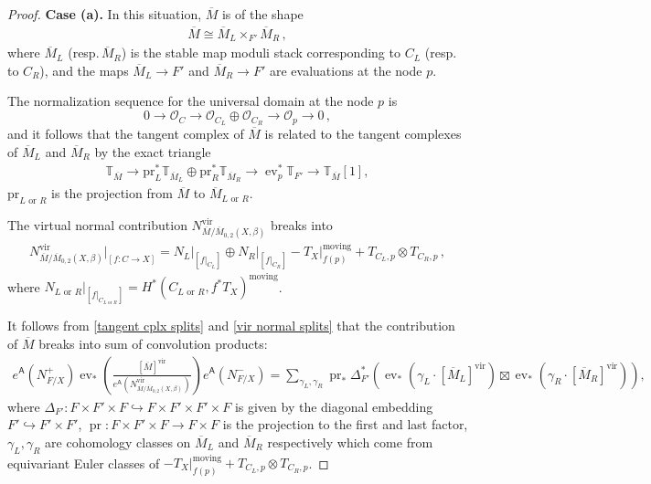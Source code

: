 \documentclass[10pt]{amsart}
\theoremstyle{definition}
\numberwithin{equation}{section}
\newcommand{\oO}{\mathcal{O}}
\newcommand{\vir}{\mathrm{vir}}
\newcommand{\sA}{\mathsf{A}}
\newcommand{\ev}{\operatorname{ev}}
\newcommand{\pr}{\operatorname{pr}}
\begin{document}
\begin{proof}
\textbf{Case (a).} In this situation, $\overline{M}$ is of the shape
\begin{align*}
    \overline{M}\cong \overline{M}_L\times_{F'} \overline{M}_R\,,
\end{align*}
where $\overline{M}_L$ (resp.\,$\overline{M}_R$) is the stable map moduli stack corresponding to $C_L$ (resp.\,to $C_R$), and the maps $\overline{M}_L\to F'$ and $\overline{M}_R\to F'$ are evaluations at the node $p$. 

The normalization sequence for the universal domain at the node $p$ is 
$$0\to \oO_{C} \to  \oO_{C_L}\oplus \oO_{C_R}\to \oO_{p} \to 0\,, $$
and it follows that the tangent complex of $\overline{M}$ is related to the tangent complexes of $\overline{M}_L$ and $\overline{M}_R$ by the exact triangle
\begin{align}\label{tangent cplx splits}
    \mathbb T_{\overline{M}}\to \mathrm{pr}_L^*\mathbb T_{\overline{M}_L}\oplus \mathrm{pr}_R^* \mathbb T_{\overline{M}_R}\to \ev_p^* \mathbb T_{F'}\to \mathbb T_{\overline{M}}[1],
\end{align}
$\mathrm{pr}_{L\text{ or }R}$ is the projection from $\overline{M}$ to $\overline{M}_{L\text{ or }R}$. 

The virtual normal contribution $N^\vir_{\overline{M}/\overline{M}_{0,2}(X,\beta)}$ breaks into
\begin{align}\label{vir normal splits}
    N^\vir_{\overline{M}/\overline{M}_{0,2}(X,\beta)}\big|_{[f\colon C\to X]}=N_L\big|_{[f|_{C_L}]}\oplus N_R\big|_{[f|_{C_R}]}-T_X|_{f(p)}^{\mathrm{moving}}+T_{C_L,p}\otimes T_{C_R,p}\,, 
\end{align}
where $N_{L\text{ or }R}\big|_{[f|_{C_{L\text{ or }R}}]}=H^*(C_{L\text{ or }R},f^*T_X)^{\mathrm{moving}}$.

It follows from \eqref{tangent cplx splits} and \eqref{vir normal splits} that the contribution of $\overline{M}$ breaks into sum of convolution products:
\begin{align*}
e^{\sA}\left(N_{F/X}^+\right)\ev_*\left(\frac{[\overline{M}]^{\vir}}{e^{\sA}\left(N^{\vir}_{\overline{M}/\overline{M}_{0,2}(X,\beta)}\right)} \right)e^{\sA}\left(N_{F/X}^-\right)=\sum_{\gamma_L,\gamma_R}\pr_*\Delta_{F'}^*\left(\ev_*(\gamma_L\cdot [\overline{M}_L]^{\vir})\boxtimes \ev_*(\gamma_R\cdot [\overline{M}_R]^{\vir})\right),
\end{align*}
where $\Delta_{F'}\colon F\times F'\times F\hookrightarrow F\times F'\times F'\times F$ is given by the diagonal embedding $F'\hookrightarrow F'\times F'$, $\pr\colon F\times F'\times F\to F\times F$ is the projection to the first and last factor, $\gamma_L,\gamma_R$ are cohomology classes on $\overline{M}_L$ and $\overline{M}_R$ respectively which come from equivariant Euler classes of $-T_X|_{f(p)}^{\mathrm{moving}}+T_{C_L,p}\otimes T_{C_R,p}$.


\end{proof}
\end{document}
